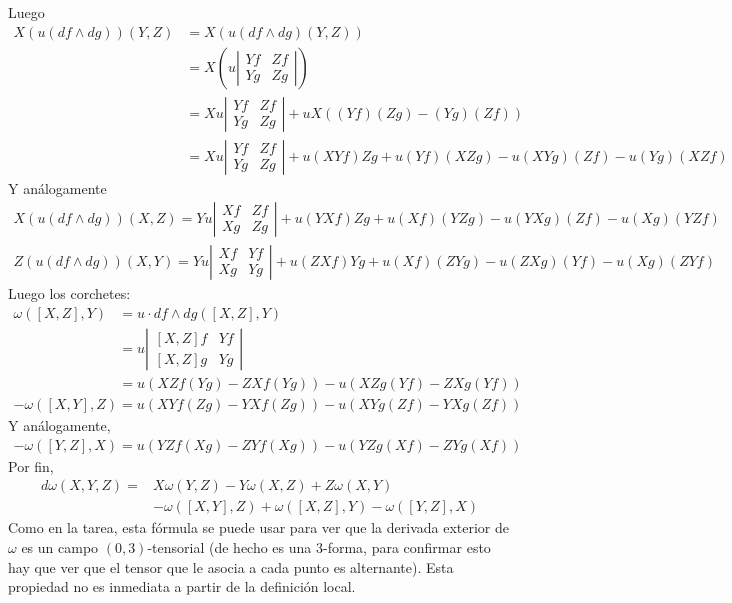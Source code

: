 \documentclass[spanish]{book}
\theoremstyle{definition}
\begin{document}
	Luego
	\begin{align*}
		X(u(df\wedge dg))(Y,Z)&=X(u(df\wedge dg)(Y,Z))\\
		&=X\left(u\left|\begin{matrix}
			Yf&Zf\\
			Yg&Zg
		\end{matrix}\right|\right)\\
		&=Xu\left|\begin{matrix}
			Yf&Zf\\
			Yg&Zg
		\end{matrix}\right|+uX((Yf)(Zg)-(Yg)(Zf))\\
		&=Xu\left|\begin{matrix}
			Yf&Zf\\
			Yg&Zg
		\end{matrix}\right|+u(XYf)Zg+u(Yf)(XZg)-u(XYg)(Zf)-u(Yg)(XZf)
	\end{align*}
	Y análogamente
	\begin{align*}
		X(u(df\wedge dg))(X,Z)=Yu\left|\begin{matrix}
			Xf&Zf\\
			Xg&Zg
		\end{matrix}\right|+u(YXf)Zg+u(Xf)(YZg)-u(YXg)(Zf)-u(Xg)(YZf)
	\end{align*}
	\begin{align*}
		Z(u(df\wedge dg))(X,Y)=Yu\left|\begin{matrix}
			Xf&Yf\\
			Xg&Yg
		\end{matrix}\right|+u(ZXf)Yg+u(Xf)(ZYg)-u(ZXg)(Yf)-u(Xg)(ZYf)
	\end{align*}
	Luego los corchetes:
	\begin{align*}
		\omega([X,Z],Y)&=u\cdot df\wedge dg([X,Z],Y)\\
		&=u\left|\begin{matrix}
			[X,Z]f&Yf\\
			[X,Z]g&Yg
		\end{matrix}\right|\\
		&=u(XZf(Yg)-ZXf(Yg))-u(XZg(Yf)-ZXg(Yf))
	\end{align*}
	\begin{align*}
		-\omega([X,Y],Z)=u(XYf(Zg)-YXf(Zg))-u(XYg(Zf)-YXg(Zf))
	\end{align*}
	Y análogamente,
	\begin{align*}
		-\omega([Y,Z],X)=u(YZf(Xg)-ZYf(Xg))-u(YZg(Xf)-ZYg(Xf))
	\end{align*}
	Por fin,
	\begin{align*}
		d\omega(X,Y,Z)=&X\omega(Y,Z)-Y\omega(X,Z)+Z\omega(X,Y)\\
		&-\omega([X,Y],Z)+\omega([X,Z],Y)-\omega([Y,Z],X)
	\end{align*}
	Como en la tarea, esta fórmula se puede usar para ver que la derivada exterior de $\omega$ es un campo $(0,3)$-tensorial (de hecho es una 3-forma, para confirmar esto hay que ver que el tensor que le asocia a cada punto es alternante). Esta propiedad no es inmediata a partir de la definición local.
	
\end{document}
